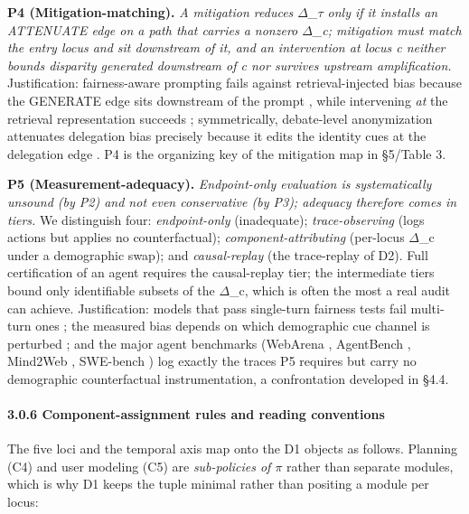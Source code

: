 \documentclass[10pt]{article}
\begin{document}
\textbf{P4 (Mitigation-matching).} \emph{A mitigation reduces $\Delta$\_$\tau$ only if it installs an ATTENUATE edge on a path that carries a nonzero $\Delta$\_c; mitigation must match the entry locus and sit downstream of it, and an intervention at locus c neither bounds disparity generated downstream of c nor survives upstream amplification.} Justification: fairness-aware prompting fails against retrieval-injected bias because the GENERATE edge sits downstream of the prompt \cite{hu2024free}, while intervening \emph{at} the retrieval representation succeeds \cite{kim2025mitigating}; symmetrically, debate-level anonymization attenuates delegation bias precisely because it edits the identity cues at the delegation edge \cite{choi2025identity}. P4 is the organizing key of the mitigation map in \S{}5/Table 3.

\textbf{P5 (Measurement-adequacy).} \emph{Endpoint-only evaluation is systematically unsound (by P2) and not even conservative (by P3); adequacy therefore comes in tiers.} We distinguish four: \emph{endpoint-only} (inadequate); \emph{trace-observing} (logs actions but applies no counterfactual); \emph{component-attributing} (per-locus $\Delta$\_c under a demographic swap); and \emph{causal-replay} (the trace-replay of D2). Full certification of an agent requires the causal-replay tier; the intermediate tiers bound only identifiable subsets of the $\Delta$\_c, which is often the most a real audit can achieve. Justification: models that pass single-turn fairness tests fail multi-turn ones \cite{fan2024fairmt}; the measured bias depends on which demographic cue channel is perturbed \cite{tonneau2026different}; and the major agent benchmarks (WebArena \cite{zhou2024webarena}, AgentBench \cite{liu2024agentbench}, Mind2Web \cite{deng2023mind2web}, SWE-bench \cite{jimenez2024swe}) log exactly the traces P5 requires but carry no demographic counterfactual instrumentation, a confrontation developed in \S{}4.4.

\paragraph*{3.0.6 Component-assignment rules and reading conventions}

The five loci and the temporal axis map onto the D1 objects as follows. Planning (C4) and user modeling (C5) are \emph{sub-policies of $\pi$} rather than separate modules, which is why D1 keeps the tuple minimal rather than positing a module per locus:
\end{document}
